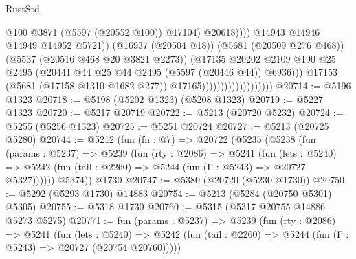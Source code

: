 \begin{lexlean}{RustStd}
\begin{coremodule}
                                                          @100
                                                          @3871
                                                          (@5597 (@20552 @100))
                                                          @17104)
                                                        @20618))))
                                                @14943
                                                @14946
                                                @14949
                                                @14952
                                                @5721))
                                            (@16937 (@20504 @18))
                                            (@5681 (@20509 @276 @468))
                                            (@5537 (@20516 @468 @20 @3821 @2273))
                                            (@17135
                                              @20202
                                              @2109
                                              @190
                                              @25
                                              @2495
                                              (@20441
                                                @44
                                                @25
                                                @44
                                                @2495
                                                (@5597 (@20446 @44))
                                                @6936)))
                                          @17153
                                          (@5681 (@17158 @1310 @1682 @277))
                                          @17165)))))))))))))))))))
@20714 := @5196 @1323
@20718 := @5198 (@5202 @1323) (@5208 @1323)
@20719 := @5227 @1323
@20720 := @5217 @20719
@20722 := @5213 (@20720 @5232)
@20724 := @5255 (@5256 @1323)
@20725 := @5251 @20724
@20727 := @5213 (@20725 @5280)
@20744 := @5212
    (fun (fn : @7) =>
    @20722
      (@5235
        (@5238
          (fun (params : @5237) =>
          @5239
            (fun (rty : @2086) =>
            @5241
              (fun (lets : @5240) =>
              @5242 (fun (tail : @2260) => @5244 (fun (Γ : @5243) => @20727 @5327))))))
        @5374))
    @1730
@20747 := @5380 (@20720 (@5230 @1730))
@20750 := @5292 (@5293 @1730) @14883
@20754 := @5213 (@5284 (@20750 @5301) @5305)
@20755 := @5318 @1730
@20760 := @5315 (@5317 @20755 @14886 @5273 @5275)
@20771 := fun (params : @5237) =>
  @5239
    (fun (rty : @2086) =>
    @5241
      (fun (lets : @5240) =>
      @5242 (fun (tail : @2260) => @5244 (fun (Γ : @5243) => @20727 (@20754 @20760)))))

\end{coremodule}
\end{lexlean}
